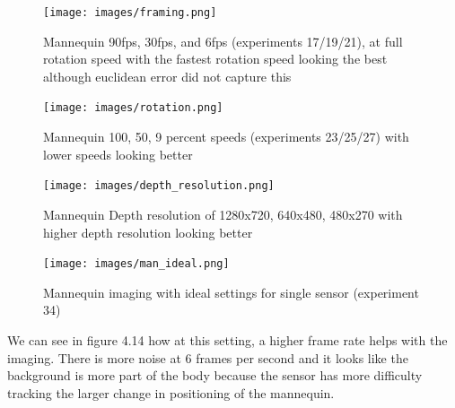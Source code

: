\begin{figure}[!htb]
	\caption{Mannequin 90fps, 30fps, and 6fps (experiments 17/19/21), at full rotation speed with the fastest rotation speed looking the best although euclidean error did not capture this}
	\centering
	\texttt{[image: images/framing.png]}
\end{figure}


\begin{figure}[!htb]
	\caption{Mannequin 100, 50, 9 percent speeds (experiments 23/25/27) with lower speeds looking better}
	\centering
	\texttt{[image: images/rotation.png]}
\end{figure}

\begin{figure}[!htb]
	\caption{Mannequin Depth resolution of 1280x720, 640x480, 480x270 with higher depth resolution looking better}
	\centering
	\texttt{[image: images/depth\_resolution.png]}
\end{figure}

\begin{figure}[!htb]
	\caption{Mannequin imaging with ideal settings for single sensor (experiment 34)}
	\centering
	\texttt{[image: images/man\_ideal.png]}
\end{figure}



We can see in figure 4.14 how at this setting, a higher frame rate helps with the imaging. There is more noise at 6 frames per second and it looks like the background is more part of the body because the sensor has more difficulty tracking the larger change in positioning of the mannequin.

